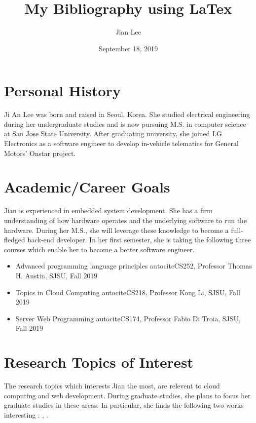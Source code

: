 \documentclass{IEEEtran}
\begin{document}
\title{My Bibliography using LaTex}
\author{Jian Lee}
\date{September 18, 2019}
\thispagestyle{plain}
\maketitle

\section{Personal History}
\label{sec:one}
Ji An Lee was born and raised in Seoul, Korea. She studied electrical engineering during her undergraduate studies and is now pursuing M.S. in computer science at San Jose State University. After graduating university, she joined LG Electronics as a software engineer to develop in-vehicle telematics for General Motors' Onstar project.

\section{Academic/Career Goals}
\label{sec:two}
Jian is experienced in embedded system development. She has a firm understanding of how hardware operates and the underlying software to run the hardware. During her M.S., she will leverage these knowledge to become a full-fledged back-end developer. In her first semester, she is taking the following three courses which enable her to become a better software engineer.

\begin{itemize}
	\item Advanced programming language principles autocite{CS252, Professor Thomas H. Austin, SJSU, Fall 2019}
	\item Topics in Cloud Computing autocite{CS218, Professor Kong Li, SJSU, Fall 2019}
	\item Server Web Programming autocite{CS174, Professor Fabio Di Troia, SJSU, Fall 2019}
\end{itemize}


\section{Research Topics of Interest}
\label{sec:three}
The research topics which interests Jian the most, are relevent to cloud computing and web development. During graduate studies, she plans to focus her graduate studies in these areas. In particular, she finds the following two works interesting : \cite{abrahami2019custom}, \cite{takabi2010security}.





\end{document}
